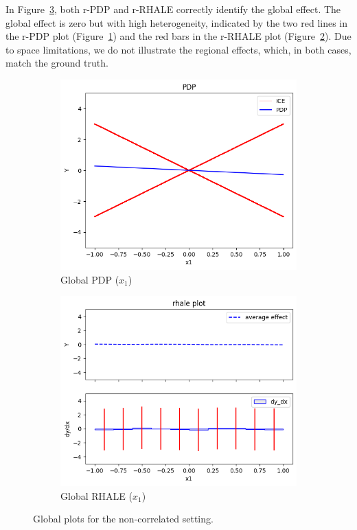 \documentclass[sigconf, nonacm]{acmart}
\begin{document}
In Figure~\ref{fig:synthetic-1-uncorrelated}, both r-PDP and r-RHALE correctly identify the global effect. The global effect is zero but with high heterogeneity, indicated by the two red lines in the r-PDP plot (Figure~\ref{subfig:global_pdp}) and the red bars in the r-RHALE plot (Figure~\ref{subfig:global_rhale}). Due to space limitations, we do not illustrate the regional effects, which, in both cases, match the ground truth.

\begin{figure}
    \centering
    \begin{subfigure}[b]{0.235\textwidth}
        \centering
        \includegraphics[width=\textwidth]{figures/simulation_1/uncor_global_pdp.png}
        \caption{Global PDP ($x_1$)}
        \label{subfig:global_pdp}
    \end{subfigure}
    \begin{subfigure}[b]{0.235\textwidth}
        \centering
        \includegraphics[width=\textwidth]{figures/simulation_1/uncor_global_rhale.png}
        \caption{Global RHALE ($x_1$)}
        \label{subfig:global_rhale}
    \end{subfigure}
    \caption{Global plots for the non-correlated setting.}
    \label{fig:synthetic-1-uncorrelated}
  \end{figure}
\end{document}
